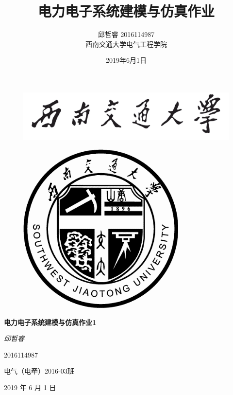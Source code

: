 \documentclass[UTF8]{ctexart}
\title{电力电子系统建模与仿真作业}
\author{邱哲睿 2016114987\\西南交通大学电气工程学院}
\date{2019年6月1日}
\numberwithin{equation}{section}
\begin{document}
	\begin{titlepage}
		\begin{center}
			\begin{figure}[htbp]
				\centering
				\includegraphics[scale=0.25]{image/School_Name.png}
			\end{figure}
			\begin{figure}[htbp]
				\centering
				\includegraphics[scale=2.7]{image/School_Badge.png}
			\end{figure}
			\phantom{h}
			\newline
			\phantom{h}
			\newline
			\phantom{h}
			\newline
			
			\normalfont \centering
			{\Huge \bfseries 电力电子系统建模与仿真作业1}
			
			\phantom{h}
			\newline
			
			\bigskip
			{\Huge \itshape 邱哲睿}
			
			\bigskip
			\bigskip
			{\Huge 2016114987}
			
			\bigskip
			\bigskip
			{\LARGE 电气（电牵）2016-03班}
			
			\bigskip
			\bigskip
			{\LARGE 2019 年 6 月 1 日}
		\end{center}
	\end{titlepage}
	\maketitle
	\pagestyle{plain}
\end{document}
